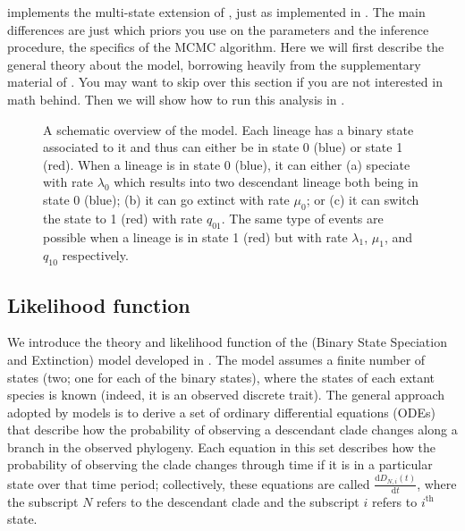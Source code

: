 \RevBayes implements the multi-state extension of \BiSSE, just as implemented in \diversitree. 
The main differences are just which priors you use on the parameters and the inference procedure, \IE the specifics of the MCMC algorithm.
Here we will first describe the general theory about the model, borrowing heavily from the supplementary material of \cite{Moore2016}.
You may want to skip over this section if you are not interested in math behind.
Then we will show how to run this analysis in \RevBayes.
\begin{figure}[h!]
\centering
{}
\caption{\small A schematic overview of the \BiSSE model. Each lineage has a binary state associated to it and thus can either be in state 0 (blue) or state 1 (red). When a lineage is in state 0 (blue), it can either (a) speciate with rate $\lambda_0$ which results into two descendant lineage both being in state 0 (blue); (b) it can go extinct with rate $\mu_0$; or (c) it can switch the state to 1 (red) with rate $q_{01}$. The same type of events are possible when a lineage is in state 1 (red) but with rate $\lambda_1$, $\mu_1$, and $q_{10}$ respectively.}
\label{fig:BiSSE_Schematic}
\end{figure}

\subsection{Likelihood function}\label{section:likelihood}
We introduce the theory and likelihood function of the \BiSSE (Binary State Speciation and Extinction) model developed in \cite{Maddison2007}.
The \BiSSE model assumes a finite number of states (two; one for each of the binary states), where the states of each extant species is known (indeed, it is an observed discrete trait).
The general approach adopted by \BiSSE models is to derive a set of ordinary differential equations (ODEs) that describe how the probability of observing a descendant clade changes along a branch in the observed phylogeny.
Each equation in this set describes how the probability of observing the clade changes through time if it is in a particular state over that time period; collectively, these equations are called $\frac{ \mathrm{d}D_{N,i}(t)}{\mathrm{d}t}$, where the subscript $N$ refers to the descendant clade and the subscript $i$ refers to $i^\text{th}$ state.

